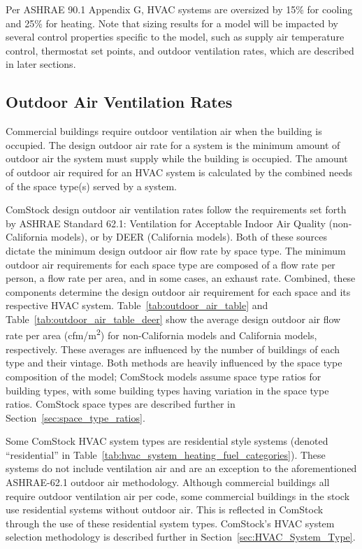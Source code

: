 Per ASHRAE 90.1 Appendix G, HVAC systems are oversized by 15\% for cooling and 25\% for heating. Note that sizing results for a model will be impacted by several control properties specific to the model, such as supply air temperature control, thermostat set points, and outdoor ventilation rates, which are described in later sections.

\subsection{Outdoor Air Ventilation Rates}

Commercial buildings require outdoor ventilation air when the building is occupied. The design outdoor air rate for a system is the minimum amount of outdoor air the system must supply while the building is occupied. The amount of outdoor air required for an HVAC system is calculated by the combined needs of the space type(s) served by a system.

ComStock design outdoor air ventilation rates follow the requirements set forth by ASHRAE Standard 62.1: Ventilation for Acceptable Indoor Air Quality (non-California models), or by DEER (California models). Both of these sources dictate the minimum design outdoor air flow rate by space type. The minimum outdoor air requirements for each space type are composed of a flow rate per person, a flow rate per area, and in some cases, an exhaust rate. Combined, these components determine the design outdoor air requirement for each space and its respective HVAC system. Table~\ref{tab:outdoor_air_table} and Table~\ref{tab:outdoor_air_table_deer} show the average design outdoor air flow rate per area (cfm/m\textsuperscript{2}) for non-California models and California models, respectively. These averages are influenced by the number of buildings of each type and their vintage. Both methods are heavily influenced by the space type composition of the model; ComStock models assume space type ratios for building types, with some building types having variation in the space type ratios. ComStock space types are described further in Section~\ref{sec:space_type_ratios}.

Some ComStock HVAC system types are residential style systems (denoted ``residential'' in Table~\ref{tab:hvac_system_heating_fuel_categories}). These systems do not include ventilation air and are an exception to the aforementioned ASHRAE-62.1 outdoor air methodology. Although commercial buildings all require outdoor ventilation air per code, some commercial buildings in the stock use residential systems without outdoor air. This is reflected in ComStock through the use of these residential system types. ComStock's HVAC system selection methodology is described further in Section~\ref{sec:HVAC_System_Type}.

